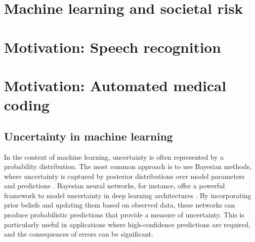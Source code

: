 


\section{Machine learning and societal risk}
\cite{europeancommission_briefing_2021}


\section{Motivation: Speech recognition}


\section{Motivation: Automated medical coding}


\subsection{Uncertainty in machine learning}


In the context of machine learning, uncertainty is often represented by a probability distribution. The most common approach is to use Bayesian methods, where uncertainty is captured by posterior distributions over model parameters and predictions \cite{gelman_bayesian_2013}. Bayesian neural networks, for instance, offer a powerful framework to model uncertainty in deep learning architectures \cite{neal_bayesian_1995}. By incorporating prior beliefs and updating them based on observed data, these networks can produce probabilistic predictions that provide a measure of uncertainty. This is particularly useful in applications where high-confidence predictions are required, and the consequences of errors can be significant.

